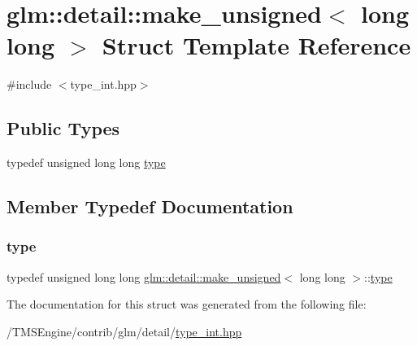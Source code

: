 \hypertarget{structglm_1_1detail_1_1make__unsigned_3_01long_01long_01_4}{}\section{glm\+:\+:detail\+:\+:make\+\_\+unsigned$<$ long long $>$ Struct Template Reference}
\label{structglm_1_1detail_1_1make__unsigned_3_01long_01long_01_4}


{\ttfamily \#include $<$type\+\_\+int.\+hpp$>$}

\subsection*{Public Types}
\begin{DoxyCompactItemize}
\item 
typedef unsigned long long \hyperlink{structglm_1_1detail_1_1make__unsigned_3_01long_01long_01_4_adb9a738bcdd4b53058383168bb8585b1}{type}
\end{DoxyCompactItemize}


\subsection{Member Typedef Documentation}
\mbox{\label{structglm_1_1detail_1_1make__unsigned_3_01long_01long_01_4_adb9a738bcdd4b53058383168bb8585b1}} 
\subsubsection{\texorpdfstring{type}{type}}
{\footnotesize\ttfamily typedef unsigned long long \hyperlink{structglm_1_1detail_1_1make__unsigned}{glm\+::detail\+::make\+\_\+unsigned}$<$ long long $>$\+::\hyperlink{structglm_1_1detail_1_1make__unsigned_3_01long_01long_01_4_adb9a738bcdd4b53058383168bb8585b1}{type}}



The documentation for this struct was generated from the following file\+:\begin{DoxyCompactItemize}
\item 
/\+T\+M\+S\+Engine/contrib/glm/detail/\hyperlink{type__int_8hpp}{type\+\_\+int.\+hpp}\end{DoxyCompactItemize}
